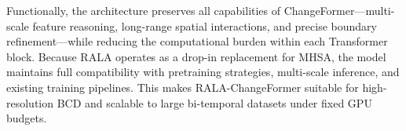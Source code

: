 Functionally, the architecture preserves all capabilities of ChangeFormer—multi-scale feature reasoning, long-range spatial interactions, and precise boundary refinement—while reducing the computational burden within each Transformer block. Because RALA operates as a drop-in replacement for MHSA, the model maintains full compatibility with pretraining strategies, multi-scale inference, and existing training pipelines. This makes RALA-ChangeFormer suitable for high-resolution BCD and scalable to large bi-temporal datasets under fixed GPU budgets.